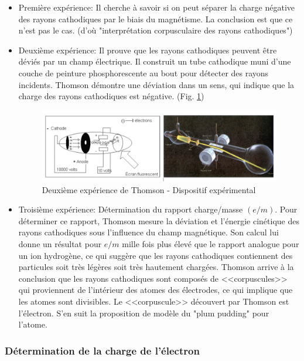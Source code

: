 \begin{itemize}
    \item Première expérience: Il cherche à savoir si on peut séparer la charge négative des rayons cathodiques par le biais du magnétisme. La conclusion est que ce n'est pas le cas. (d'où "interprétation corpusculaire des rayons cathodiques")
    \item Deuxième expérience: Il prouve que les rayons cathodiques peuvent être déviés par un champ électrique. Il construit un tube cathodique muni d'une couche de peinture phosphorescente au bout pour détecter des rayons incidents. Thomson démontre une déviation dans un sens, qui indique que la charge des rayons cathodiques est négative. (Fig. \ref{fig:thompson_exp_2})

    \begin{figure}[ht]
        \centering
        \includegraphics[scale=0.60]{Images1/2eexpthomson.PNG}
        \caption{Deuxième expérience de Thomson - Dispositif expérimental}
        \label{fig:thompson_exp_2}
    \end{figure}

    \item Troisième expérience: Détermination du rapport charge/masse $(e/m)$. Pour déterminer ce rapport, Thomson mesure la déviation et l'énergie cinétique des rayons cathodiques sous l'influence du champ magnétique. Son calcul lui donne un résultat pour $e/m$ mille fois plus élevé que le rapport analogue pour un ion hydrogène, ce qui suggère que les rayons cathodiques contiennent des particules soit très légères soit très hautement chargées. Thomson arrive à la conclusion que les rayons cathodiques sont composés de <<corpuscules>> qui proviennent de l'intérieur des atomes des électrodes, ce qui implique que les atomes sont divisibles. Le <<corpuscule>> découvert par Thomson est l'électron.
    S'en suit la proposition de modèle du "plum pudding" pour l'atome.
\end{itemize}

\subsubsection*{Détermination de la charge de l'électron}

